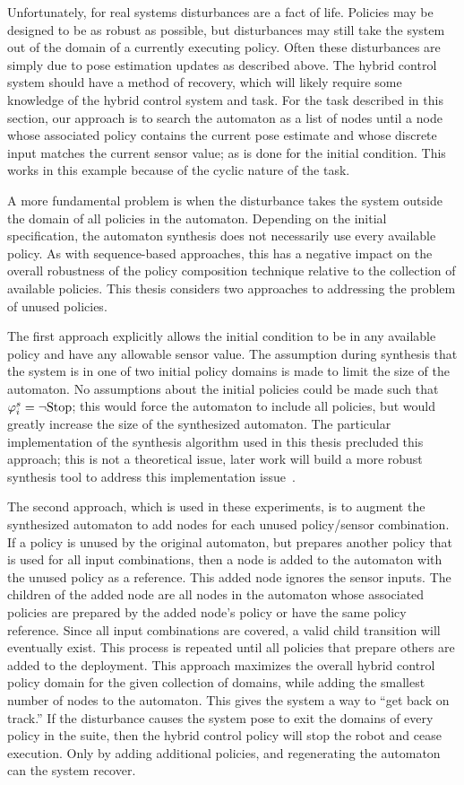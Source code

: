 Unfortunately, for real systems disturbances are a fact of life.  Policies may be
designed to be as robust as possible, but disturbances may still take the system out
of the domain of a currently executing policy.  Often these disturbances are simply
due to pose estimation updates as described above.  The hybrid control system should
have a method of recovery, which will likely require some knowledge of the hybrid
control system and task.  For the task described in this section, our approach is to
search the automaton as a list of nodes until a node whose associated policy contains
the current pose estimate and whose discrete input matches the current sensor value;
as is done for the initial condition. This works in this example because of the
cyclic nature of the task.  

A more fundamental problem is when the disturbance takes the system
outside the domain of all policies in the automaton.  Depending on the
initial specification, the automaton synthesis does not necessarily
use every available policy.  As with sequence-based approaches, this
has a negative impact on the overall robustness of the policy
composition technique relative to the collection of available
policies.  This thesis considers two approaches to addressing the
problem of unused policies.

The first approach explicitly allows the initial condition to be in any available
policy and have any allowable sensor value.  The assumption during synthesis that the
system is in one of two initial policy domains is made to limit the size of the
automaton.  No assumptions about the initial policies could be made such that
$\varphi_i^s=\neg\mathrm{Stop}$; this would force the automaton to include all policies, but
would greatly increase the size of the synthesized automaton.  The particular
implementation of the synthesis algorithm used in this thesis precluded this
approach; this is not a theoretical issue, later work will build a more robust
synthesis tool to address this implementation issue~\cite{hadas_pc}.

The second approach, which is used in these experiments, is to augment the
synthesized automaton to add nodes for each unused policy/sensor combination.  If a
policy is unused by the original automaton, but prepares another policy that is used
for all input combinations, then a node is added to the automaton with the unused
policy as a reference.  This added node ignores the sensor inputs.  The children of
the added node are all nodes in the automaton whose associated policies are prepared
by the added node's policy or have the same policy reference.  Since all input
combinations are covered, a valid child transition will eventually exist.  This
process is repeated until all policies that prepare others are added to the
deployment.  This approach maximizes the overall hybrid control policy domain for the
given collection of domains, while adding the smallest number of nodes to the
automaton.  This gives the system a way to ``get back on track.''  If the disturbance
causes the system pose to exit the domains of every policy in the suite, then the
hybrid control policy will stop the robot and cease execution.  Only by adding
additional policies, and regenerating the automaton can the system recover.


